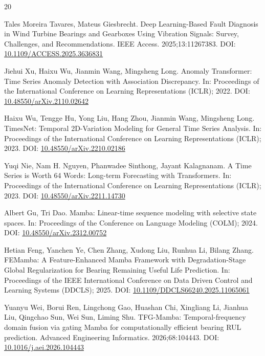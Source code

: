 \documentclass[cmes,article,submit,moreauthors,pdftex]{Definitions/tsp}
\begin{document}
\begin{thebibliography}{20}

Tales Moreira Tavares, Mateus Giesbrecht. Deep Learning-Based Fault Diagnosis in Wind Turbine Bearings and Gearboxes Using Vibration Signals: Survey, Challenges, and Recommendations. IEEE Access. 2025;13:11267383. DOI: \href{https://doi.org/10.1109/ACCESS.2025.3636831}{10.1109/ACCESS.2025.3636831}

Jiehui Xu, Haixu Wu, Jianmin Wang, Mingsheng Long. Anomaly Transformer: Time Series Anomaly Detection with Association Discrepancy. In: Proceedings of the International Conference on Learning Representations (ICLR); 2022. DOI: \href{https://doi.org/10.48550/arXiv.2110.02642}{10.48550/arXiv.2110.02642}

Haixu Wu, Tengge Hu, Yong Liu, Hang Zhou, Jianmin Wang, Mingsheng Long. TimesNet: Temporal 2D-Variation Modeling for General Time Series Analysis. In: Proceedings of the International Conference on Learning Representations (ICLR); 2023. DOI: \href{https://doi.org/10.48550/arXiv.2210.02186}{10.48550/arXiv.2210.02186}

Yuqi Nie, Nam H. Nguyen, Phanwadee Sinthong, Jayant Kalagnanam. A Time Series is Worth 64 Words: Long-term Forecasting with Transformers. In: Proceedings of the International Conference on Learning Representations (ICLR); 2023. DOI: \href{https://doi.org/10.48550/arXiv.2211.14730}{10.48550/arXiv.2211.14730}

Albert Gu, Tri Dao. Mamba: Linear-time sequence modeling with selective state spaces. In: Proceedings of the Conference on Language Modeling (COLM); 2024. DOI: \href{https://doi.org/10.48550/arXiv.2312.00752}{10.48550/arXiv.2312.00752}

Hetian Feng, Yanchen Ye, Chen Zhang, Xudong Liu, Runhua Li, Bilang Zhang. FEMamba: A Feature-Enhanced Mamba Framework with Degradation-Stage Global Regularization for Bearing Remaining Useful Life Prediction. In: Proceedings of the IEEE International Conference on Data Driven Control and Learning Systems (DDCLS); 2025. DOI: \href{https://doi.org/10.1109/DDCLS66240.2025.11065061}{10.1109/DDCLS66240.2025.11065061}

Yuanyu Wei, Borui Ren, Lingchong Gao, Huashan Chi, Xingliang Li, Jianhua Liu, Qingchao Sun, Wei Sun, Liming Shu. TFG-Mamba: Temporal-frequency domain fusion via gating Mamba for computationally efficient bearing RUL prediction. Advanced Engineering Informatics. 2026;68:104443. DOI: \href{https://doi.org/10.1016/j.aei.2026.104443}{10.1016/j.aei.2026.104443}


\end{thebibliography}
\end{document}
